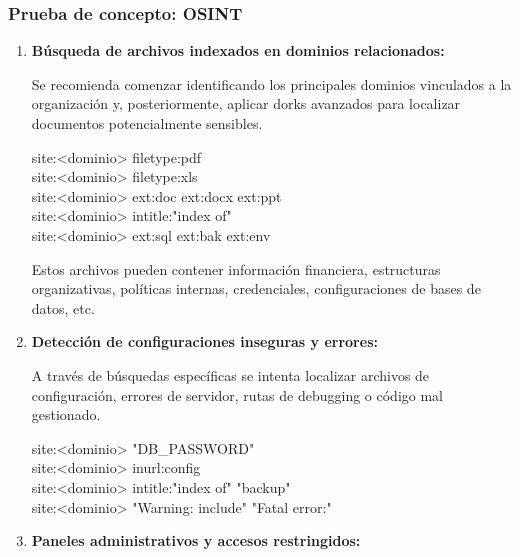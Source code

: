 \documentclass[a4paper, 11pt]{article}
\begin{document}
\subsubsection*{Prueba de concepto: OSINT}

\begin{enumerate}
    \item \textbf{Búsqueda de archivos indexados en dominios relacionados:}

    Se recomienda comenzar identificando los principales dominios vinculados a la organización y, posteriormente, aplicar dorks avanzados para localizar documentos potencialmente sensibles.

    \begin{tcolorbox}[colback=yellow!20!white, colframe=orange!80!black, title={Dorks para documentos y configuraciones}]
    \small
    site:<dominio> filetype:pdf \\
    site:<dominio> filetype:xls \\
    site:<dominio> ext:doc \textbar{} ext:docx \textbar{} ext:ppt \\
    site:<dominio> intitle:"index of" \\
    site:<dominio> ext:sql \textbar{} ext:bak \textbar{} ext:env
    \end{tcolorbox}

    Estos archivos pueden contener información financiera, estructuras organizativas, políticas internas, credenciales, configuraciones de bases de datos, etc.

    \item \textbf{Detección de configuraciones inseguras y errores:}

    A través de búsquedas específicas se intenta localizar archivos de configuración, errores de servidor, rutas de debugging o código mal gestionado.

 
\begin{tcolorbox}[colback=yellow!20!white, colframe=orange!80!black, title={Dorks para errores y configuraciones expuestas}]
    \small
    site:<dominio> "DB\_PASSWORD" \\
    site:<dominio> inurl:config \\
    site:<dominio> intitle:"index of" "backup" \\
    site:<dominio> "Warning: include" \textbar{} "Fatal error:"
    \end{tcolorbox}

    \item \textbf{Paneles administrativos y accesos restringidos:}


\end{enumerate}
\end{document}
